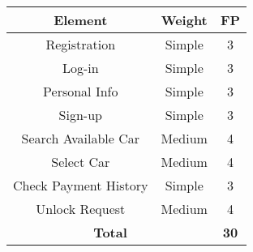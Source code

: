 \begin{center}
\begin{tabular}{|c|c|c|}
\hline
\multicolumn{1}{|c|}{\textbf{Element}} & \multicolumn{1}{c|}{\textbf{Weight}} & \multicolumn{1}{c|}{\textbf{FP}}\\
\hline
Registration				&Simple		&3\\
Log-in 						&Simple 	&3\\
Personal Info				&Simple		&3\\
Sign-up 					&Simple 	&3\\
Search Available Car		&Medium		&4\\
Select Car					&Medium		&4\\
Check Payment History		&Simple		&3\\
Unlock Request				&Medium	&4\\
\hline
\multicolumn{2}{|c|}{\textbf{Total}} & \multicolumn{1}{c|}{\textbf{30}}\\
\hline
\end{tabular}

\end{center}


